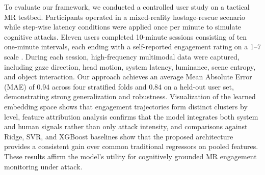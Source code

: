 \documentclass[review]{vgtc}                 %
\begin{document}
To evaluate our framework, we conducted a controlled user study on a tactical MR testbed. Participants operated in a mixed-reality hostage-rescue scenario while step-wise latency conditions were applied once per minute to simulate cognitive attacks. Eleven users completed 10-minute sessions consisting of ten one-minute intervals, each ending with a self-reported engagement rating on a 1--7 scale \cite{joshi2015likert}. During each session, high-frequency multimodal data were captured, including gaze direction, head motion, system latency, luminance, scene entropy, and object interaction. Our approach achieves an average Mean Absolute Error (MAE) of 0.94 across four stratified folds and 0.84 on a held-out user set, demonstrating strong generalization and robustness. Visualization of the learned embedding space shows that engagement trajectories form distinct clusters by level, feature attribution analysis confirms that the model integrates both system and human signals rather than only attack intensity, and comparisons against Ridge, SVR, and XGBoost baselines show that the proposed architecture provides a consistent gain over common traditional regressors on pooled features. These results affirm the model’s utility for cognitively grounded MR engagement monitoring under attack.




\end{document}
